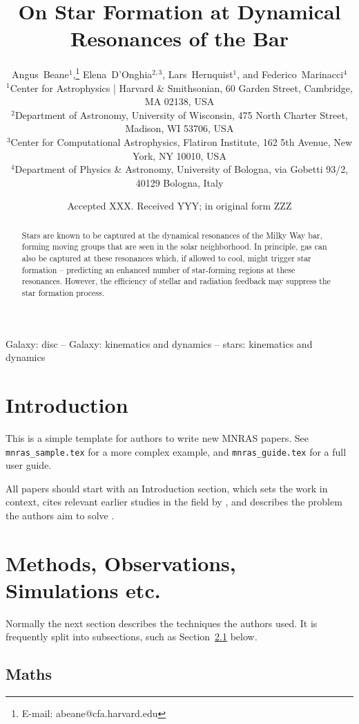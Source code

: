 \documentclass[a4paper,fleqn,usenatbib]{mnras}
\title[Star Bar]{On Star Formation at Dynamical Resonances of the Bar}
\author[A. Beane et al.]{
Angus~Beane$^{1}$,\thanks{E-mail: abeane@cfa.harvard.edu}
Elena~D'Onghia$^{2,3}$,
Lars~Hernquist$^{1}$,
and Federico~Marinacci$^{4}$
\\
$^{1}$Center for Astrophysics {\normalfont |} Harvard \& Smithsonian, 60 Garden Street, Cambridge, MA 02138, USA\\
$^{2}$Department of Astronomy, University of Wisconsin, 475 North Charter Street, Madison, WI 53706, USA\\
$^{3}$Center for Computational Astrophysics, Flatiron Institute, 162 5th Avenue, New York, NY 10010, USA\\
$^{4}$Department of Physics \& Astronomy, University of Bologna, via Gobetti 93/2, 40129 Bologna, Italy
}
\date{Accepted XXX. Received YYY; in original form ZZZ}
\begin{document}
\label{firstpage}
\pagerange{\pageref{firstpage}--\pageref{lastpage}}
\maketitle

\begin{abstract}
Stars are known to be captured at the dynamical resonances of the Milky Way
bar, forming moving groups that are seen in the solar neighborhood. In
principle, gas can also be captured at these resonances which, if allowed to
cool, might trigger star formation -- predicting an enhanced number of
star-forming regions at these resonances. However, the efficiency of stellar
and radiation feedback may suppress the star formation process. 
\end{abstract}

\begin{keywords}
Galaxy: disc -- Galaxy: kinematics and dynamics -- stars: kinematics and dynamics
\end{keywords}



\section{Introduction}

This is a simple template for authors to write new MNRAS papers.
See \texttt{mnras\_sample.tex} for a more complex example, and \texttt{mnras\_guide.tex}
for a full user guide.

All papers should start with an Introduction section, which sets the work
in context, cites relevant earlier studies in the field by \citet{Others2013},
and describes the problem the authors aim to solve \citep[e.g.][]{Author2012}.

\section{Methods, Observations, Simulations etc.}

Normally the next section describes the techniques the authors used.
It is frequently split into subsections, such as Section~\ref{sec:maths} below.

\subsection{Maths}
\label{sec:maths} %
\end{document}
